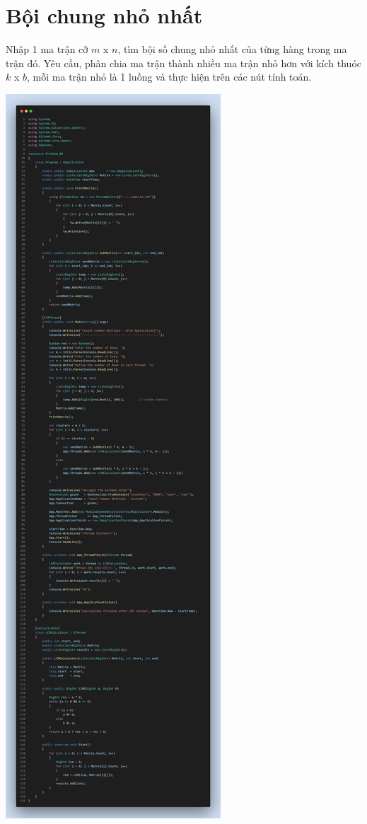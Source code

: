 \documentclass[12pt,a4paper]{report}
\begin{document}
\chapter{Bội chung nhỏ nhất}

\begin{tcolorbox}[title=Đề bài, colback=red!5!white, colframe=red!70!black]
Nhập 1 ma trận cỡ $m$ x $n$, tìm bội số chung nhỏ nhất của từng hàng trong ma trận đó. Yêu cầu, phân chia ma trận thành nhiều ma trận nhỏ hơn với kích thuóc $k$ x $b$, mỗi ma trận nhỏ là 1 luồng và thực hiện trên các nút tính toán.
\end{tcolorbox}

\begin{center}
\includegraphics[trim=0in 67.25in 0in 0in, clip, scale=.23]{./Figures/Problem_02/Problem_02}

\end{center}
\end{document}

